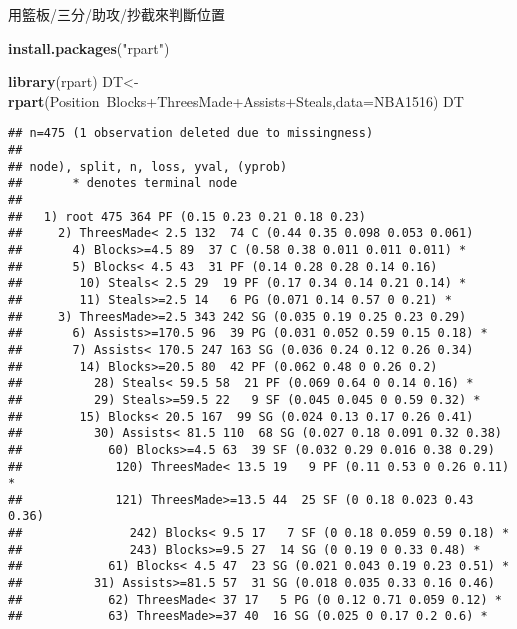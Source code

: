 \documentclass[]{book}
\newenvironment{Shaded}{\begin{snugshade}}{\end{snugshade}}
\newcommand{\KeywordTok}[1]{\textcolor[rgb]{0.13,0.29,0.53}{\textbf{{#1}}}}
\newcommand{\DataTypeTok}[1]{\textcolor[rgb]{0.13,0.29,0.53}{{#1}}}
\newcommand{\StringTok}[1]{\textcolor[rgb]{0.31,0.60,0.02}{{#1}}}
\newcommand{\NormalTok}[1]{{#1}}
\begin{document}
用籃板/三分/助攻/抄截來判斷位置

\begin{Shaded}
\begin{Highlighting}[]
\KeywordTok{install.packages}\NormalTok{(}\StringTok{"rpart"}\NormalTok{)}
\end{Highlighting}
\end{Shaded}

\begin{Shaded}
\begin{Highlighting}[]
\KeywordTok{library}\NormalTok{(rpart)}
\NormalTok{DT<-}\KeywordTok{rpart}\NormalTok{(Position~Blocks+ThreesMade+Assists+Steals,}\DataTypeTok{data=}\NormalTok{NBA1516)}
\NormalTok{DT}
\end{Highlighting}
\end{Shaded}

\begin{verbatim}
## n=475 (1 observation deleted due to missingness)
## 
## node), split, n, loss, yval, (yprob)
##       * denotes terminal node
## 
##   1) root 475 364 PF (0.15 0.23 0.21 0.18 0.23)  
##     2) ThreesMade< 2.5 132  74 C (0.44 0.35 0.098 0.053 0.061)  
##       4) Blocks>=4.5 89  37 C (0.58 0.38 0.011 0.011 0.011) *
##       5) Blocks< 4.5 43  31 PF (0.14 0.28 0.28 0.14 0.16)  
##        10) Steals< 2.5 29  19 PF (0.17 0.34 0.14 0.21 0.14) *
##        11) Steals>=2.5 14   6 PG (0.071 0.14 0.57 0 0.21) *
##     3) ThreesMade>=2.5 343 242 SG (0.035 0.19 0.25 0.23 0.29)  
##       6) Assists>=170.5 96  39 PG (0.031 0.052 0.59 0.15 0.18) *
##       7) Assists< 170.5 247 163 SG (0.036 0.24 0.12 0.26 0.34)  
##        14) Blocks>=20.5 80  42 PF (0.062 0.48 0 0.26 0.2)  
##          28) Steals< 59.5 58  21 PF (0.069 0.64 0 0.14 0.16) *
##          29) Steals>=59.5 22   9 SF (0.045 0.045 0 0.59 0.32) *
##        15) Blocks< 20.5 167  99 SG (0.024 0.13 0.17 0.26 0.41)  
##          30) Assists< 81.5 110  68 SG (0.027 0.18 0.091 0.32 0.38)  
##            60) Blocks>=4.5 63  39 SF (0.032 0.29 0.016 0.38 0.29)  
##             120) ThreesMade< 13.5 19   9 PF (0.11 0.53 0 0.26 0.11) *
##             121) ThreesMade>=13.5 44  25 SF (0 0.18 0.023 0.43 0.36)  
##               242) Blocks< 9.5 17   7 SF (0 0.18 0.059 0.59 0.18) *
##               243) Blocks>=9.5 27  14 SG (0 0.19 0 0.33 0.48) *
##            61) Blocks< 4.5 47  23 SG (0.021 0.043 0.19 0.23 0.51) *
##          31) Assists>=81.5 57  31 SG (0.018 0.035 0.33 0.16 0.46)  
##            62) ThreesMade< 37 17   5 PG (0 0.12 0.71 0.059 0.12) *
##            63) ThreesMade>=37 40  16 SG (0.025 0 0.17 0.2 0.6) *
\end{verbatim}
\end{document}
